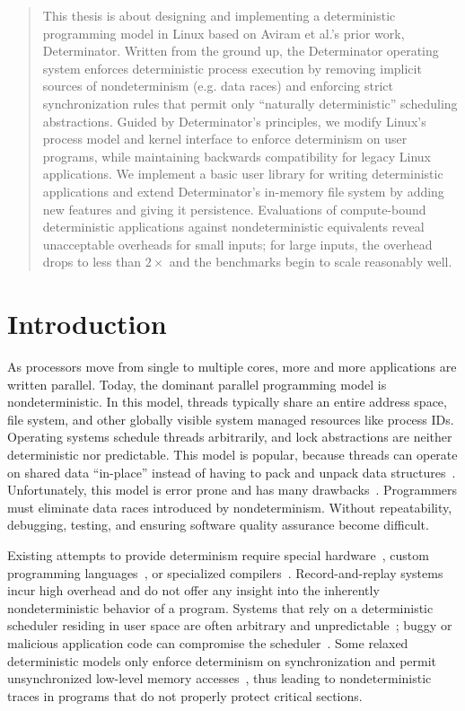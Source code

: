 
\begin{abstract}
This thesis is about designing and implementing a deterministic programming
model in Linux based on Aviram et al.'s prior work, Determinator. Written from
the ground up, the Determinator operating system enforces deterministic process
execution by
removing implicit sources of nondeterminism (e.g. data races) and enforcing
strict synchronization rules that permit only ``naturally deterministic''
scheduling abstractions. Guided by Determinator's principles, we modify
Linux's process model and kernel interface to enforce determinism on user
programs, while maintaining backwards compatibility for legacy Linux
applications. We implement a basic user library for writing deterministic
applications and extend Determinator's in-memory file system by adding new
features and giving it persistence. Evaluations of compute-bound deterministic
applications against nondeterministic equivalents reveal unacceptable
overheads for small inputs; for large inputs, the overhead drops to less
than $2\times$ and the benchmarks begin to scale reasonably well.

\end{abstract}

\section{Introduction}
As processors move from single to multiple cores, more and more applications are
written parallel. Today, the dominant parallel programming model is
nondeterministic. In this model, threads typically share an entire address
space, file system, and other globally visible system managed resources like
process IDs. Operating systems schedule threads arbitrarily, and
lock abstractions are neither deterministic nor predictable. This model is
popular, because threads can operate on shared data ``in-place'' instead of
having to pack and unpack data structures~\cite{Aviram10}. Unfortunately, this
model is error prone and has many drawbacks~\cite{artho2003high,lee2006problem,
lu2008learning}. Programmers must eliminate data races introduced by
nondeterminism. Without repeatability, debugging, testing, and ensuring
software quality assurance become difficult.

Existing attempts to provide determinism require
special hardware~\cite{Devietti09,devietti2011rcdc}, custom programming
languages~\cite{bocchino2009type}, or specialized
compilers~\cite{bergan2010coredet}. Record-and-replay
systems~\cite{leblanc1987debugging,montesinos2008delorean} incur high
overhead and do not offer any insight into the inherently nondeterministic
behavior of a program. Systems that rely on a deterministic
scheduler residing in user space are often arbitrary and
unpredictable~\cite{olszewski2009kendo}; buggy or malicious application code
can compromise the scheduler~\cite{Aviram10,cui2010stable,bergan2010coredet}. 
Some relaxed deterministic models only enforce determinism on synchronization
and permit unsynchronized low-level memory accesses~\cite{olszewski2009kendo},
thus leading to nondeterministic traces in programs that do not properly protect
critical sections.

